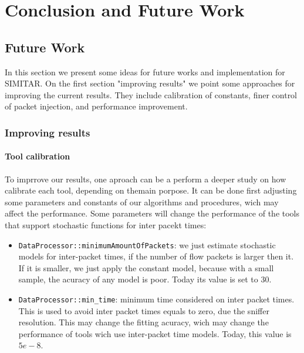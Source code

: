 \chapter{Conclusion and Future Work}
\label{ch:conclusion}

\section{Future Work}

In this section we present some ideas for future works and implementation for SIMITAR. On the first section "improving results" we point some approaches for improving the current results. They include calibration of constants, finer control of packet injection, and performance improvement.

\subsection{Improving results}

\subsubsection{Tool calibration}

To imprrove our results, one aproach can be a perform  a deeper study on how calibrate each tool, depending on themain porpose. It can be done first adjusting some parameters and constants of our algorithms and procedures, wich may affect the performance. Some parameters will change the performance  of the tools that support stochastic functions for inter pacekt times:

\begin{itemize}
	
	\item \texttt{DataProcessor::minimumAmountOfPackets}: we just estimate stochastic models for inter-packet times, if the number of flow packets is larger then it. If it is smaller, we just apply the constant model, because with a small sample, the acuracy of any model is poor. Today its value is set to 30.
	
	\item \texttt{DataProcessor::min\_time}: minimum time considered on inter packet times. This is used to avoid inter packet times equals to zero, due the sniffer resolution. This may change the fitting acuracy, wich may change the performance of tools wich use inter-packet time models. Today, this value is $5e-8$. 

\end{itemize}

